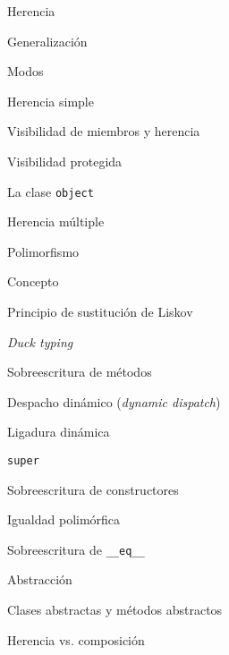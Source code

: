 \begin{longenum}
\begin{longenum}
\begin{longenum}
        \end{longenum}
        \item Herencia
        \begin{longenum}
            \item Generalización
            \item Modos
            \begin{longenum}
                \item Herencia simple
                \item Visibilidad de miembros y herencia
                \begin{longenum}
                    \item Visibilidad protegida
                \end{longenum}
                \item La clase \texttt{object}
                \item Herencia múltiple
            \end{longenum}
        \end{longenum}
        \item Polimorfismo
        \begin{longenum}
            \item Concepto
            \item Principio de sustitución de Liskov
            \item \textit{Duck typing}
            \item Sobreescritura de métodos
            \begin{longenum}
                \item Despacho dinámico (\textit{dynamic dispatch})
            \end{longenum}
            \item Ligadura dinámica
            \item \texttt{super}
            \item Sobreescritura de constructores
            \item Igualdad polimórfica
            \item Sobreescritura de \texttt{\_\_eq\_\_}
        \end{longenum}
        \item Abstracción
        \begin{longenum}
            \item Clases abstractas y métodos abstractos
        \end{longenum}
        \item Herencia vs. composición

\end{longenum}
\end{longenum}
